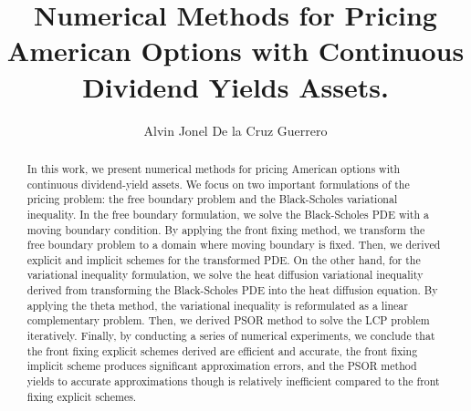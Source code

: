 \documentclass{uonmathreport}
\title{Numerical Methods for Pricing American Options with Continuous Dividend Yields Assets.}
\author{Alvin Jonel De la Cruz Guerrero}
\begin{document}
\maketitle

\begin{abstract}

  In this work, we present numerical methods for pricing American options with continuous dividend-yield assets. We focus on two important formulations of the pricing problem: the free boundary problem and the Black-Scholes variational inequality. In the free boundary formulation, we solve the Black-Scholes PDE with a moving boundary condition. By applying the front fixing method, we transform the free boundary problem to a domain where moving boundary is fixed. Then, we derived explicit and implicit schemes for the transformed PDE. On the other hand, for the variational inequality formulation, we solve the heat diffusion variational inequality derived from transforming the Black-Scholes PDE into the heat diffusion equation. By applying the theta method, the variational inequality is reformulated as a linear complementary problem. Then, we derived PSOR method to solve the LCP problem iteratively. Finally, by conducting a series of numerical experiments, we conclude that the front fixing explicit schemes derived are efficient and accurate, the front fixing implicit scheme produces significant approximation errors, and the PSOR method yields to accurate approximations though is relatively inefficient compared to the front fixing explicit schemes.
  
\end{abstract}

\setcounter{tocdepth}{3}  %
\tableofcontents 
\newpage
{}




% 


% 
\newpage

\appendix


\end{document}
